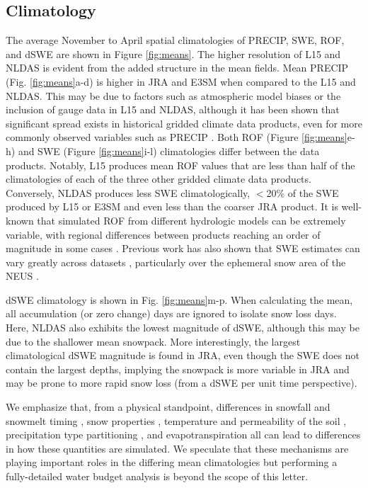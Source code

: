 \documentclass[draft]{agujournal2019}
\begin{document}
\subsection{Climatology}

The average November to April spatial climatologies of PRECIP, SWE, ROF, and dSWE are shown in Figure \ref{fig:means}. 
The higher resolution of L15 and NLDAS is evident from the added structure in the mean fields. 
Mean PRECIP (Fig. \ref{fig:means}a-d) is higher in JRA and E3SM when compared to the L15 and NLDAS. 
This may be due to factors such as atmospheric model biases or the inclusion of gauge data in L15 and NLDAS, although it has been shown that significant spread exists in historical gridded climate data products, even for more commonly observed variables such as PRECIP \citep{gutmann2012comparison,livneh2014filling,henn2018an}.
Both ROF (Figure \ref{fig:means}e-h) and SWE (Figure \ref{fig:means}i-l) climatologies differ between the data products. 
Notably, L15 produces mean ROF values that are less than half of the climatologies of each of the three other gridded climate data products. 
Conversely, NLDAS produces less SWE climatologically, $<$20\% of the SWE produced by L15 or E3SM and even less than the coarser JRA product. 
It is well-known that simulated ROF from different hydrologic models can be extremely variable, with regional differences between products reaching an order of magnitude in some cases \citep{gudmundsson2012comparing,sood2015global,beck2017global}. 
Previous work has also shown that SWE estimates can vary greatly across datasets \citep{lundquist2015high,Rhoades2018a}, particularly over the ephemeral snow area of the NEUS \citep{mccrary2017evaluation,mccrary2022projections}. 

dSWE climatology is shown in Fig. \ref{fig:means}m-p.
When calculating the mean, all accumulation (or zero change) days are ignored to isolate snow loss days. 
Here, NLDAS also exhibits the lowest magnitude of dSWE, although this may be due to the shallower mean snowpack. 
More interestingly, the largest climatological dSWE magnitude is found in JRA, even though the SWE does not contain the largest depths, implying the snowpack is more variable in JRA and may be prone to more rapid snow loss (from a dSWE per unit time perspective).

We emphasize that, from a physical standpoint, differences in snowfall and snowmelt timing \citep{rauscher2008future,mccabe2005trends}, snow properties \citep{brown2006evaluation}, temperature and permeability of the soil \citep{niu2006effects}, precipitation type partitioning \citep{knowles2006trends}, and evapotranspiration \citep{zheng2019on} all can lead to differences in how these quantities are simulated. We speculate that these mechanisms are playing important roles in the differing mean climatologies but performing a fully-detailed water budget analysis is beyond the scope of this letter.
\end{document}
